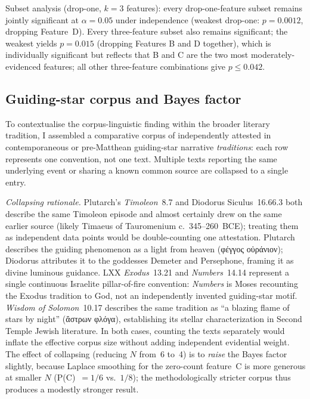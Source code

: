 \documentclass[11pt,a4paper]{article}
\newcommand{\grk}[1]{{\fontencoding{LGR}\selectfont #1}}
\newcommand{\grk}[1]{{\greekfont #1}}
\begin{document}
Subset analysis (drop-one, $k=3$ features): every drop-one-feature subset
remains jointly significant at $\alpha = 0.05$ under independence (weakest
drop-one: $p = 0.0012$, dropping Feature~D). Every three-feature subset also
remains significant; the weakest yields $p = 0.015$ (dropping Features B and D
together), which is
individually significant but reflects that B and C are the two most
moderately-evidenced features; all other three-feature combinations give
$p \leq 0.042$.

\subsection{Guiding-star corpus and Bayes factor}\label{subsec:guidingbf}

To contextualise the corpus-linguistic finding within the broader literary
tradition, I assembled a comparative corpus of independently attested in contemporaneous or
pre-Matthean guiding-star narrative \emph{traditions}: each row represents
one convention, not one text. Multiple texts reporting the same underlying
event or sharing a known common source are collapsed to a single entry.

\medskip\noindent\textit{Collapsing rationale.}
Plutarch's \textit{Timoleon}~8.7 and Diodorus Siculus~16.66.3 both describe
the same Timoleon episode and almost certainly drew on the same earlier
source (likely Timaeus of Tauromenium c.~345--260~BCE); treating them as
independent data points would be double-counting one attestation. Plutarch
describes the guiding phenomenon as a light from heaven (\grk{φέγγος
οὐράνιον}); Diodorus attributes it to the goddesses Demeter and Persephone,
framing it as divine luminous guidance.
LXX \textit{Exodus}~13.21 and \textit{Numbers}~14.14 represent a single
continuous Israelite pillar-of-fire convention: \textit{Numbers} is Moses
recounting the Exodus tradition to God, not an independently invented
guiding-star motif. \textit{Wisdom of Solomon}~10.17 describes the same
tradition as ``a blazing flame of stars by night''
(\grk{ἄστρων φλόγα}), establishing its stellar characterization in
Second Temple Jewish literature. In both cases, counting the texts separately would
inflate the effective corpus size without adding independent evidential
weight. The effect of collapsing (reducing $N$ from~6 to~4) is to
\emph{raise} the Bayes factor slightly, because Laplace smoothing for the
zero-count feature~C is more generous at smaller $N$ (P(C)~$= 1/6$ vs.\
$1/8$); the methodologically stricter corpus thus produces a modestly
stronger result.
\end{document}
